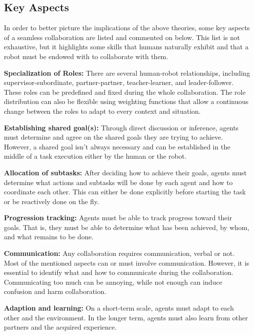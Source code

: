 \subsection{Key Aspects}


In order to better picture the implications of the above theories, some key aspects of a seamless collaboration are listed and commented on below. This list is not exhaustive, but it highlights some skills that humans naturally exhibit and that a robot must be endowed with to collaborate with them. 

\textbf{Specialization of Roles:} There are several human-robot relationships, including supervisor-subordinate, partner-partner, teacher-learner, and leader-follower. These roles can be predefined and fixed during the whole collaboration. The role distribution can also be flexible using weighting functions that allow a continuous change between the roles to adapt to every context and situation.

\textbf{Establishing shared goal(s):} Through direct discussion or inference, agents must determine and agree on the shared goals they are trying to achieve. However, a shared goal isn't always necessary and can be established in the middle of a task execution either by the human or the robot.

\textbf{Allocation of subtasks:} After deciding how to achieve their goals, agents must determine what actions and subtasks will be done by each agent and how to coordinate each other. This can either be done explicitly before starting the task or be reactively done on the fly.

\textbf{Progression tracking:} Agents must be able to track progress toward their goals. That is, they must be able to determine what has been achieved, by whom, and what remains to be done. 

\textbf{Communication:} Any collaboration requires communication, verbal or not. Most of the mentioned aspects can or must involve communication. However, it is essential to identify what and how to communicate during the collaboration. Communicating too much can be annoying, while not enough can induce confusion and harm collaboration.

\textbf{Adaption and learning:} On a short-term scale, agents must adapt to each other and the environment. In the longer term, agents must also learn from other partners and the acquired experience.

